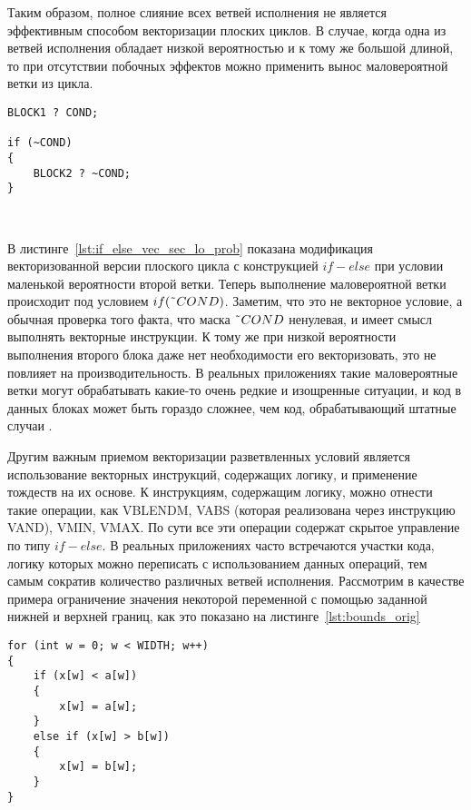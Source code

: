 \documentclass[
11pt,%
tightenlines,%
twoside,%
onecolumn,%
nofloats,%
nobibnotes,%
nofootinbib,%
superscriptaddress,%
noshowpacs,%
centertags]%
{revtex4}
\begin{document}
Таким образом, полное слияние всех ветвей исполнения не является эффективным способом векторизации плоских циклов.
В случае, когда одна из ветвей исполнения обладает низкой вероятностью и к тому же большой длиной, то при отсутствии побочных эффектов можно применить вынос маловероятной ветки из цикла.

\begin{lstlisting}[caption={Векторизованная конструкция $if-else$ с маловероятной второй веткой.},label={lst:if_else_vec_sec_lo_prob}]
BLOCK1 ? COND;

if (~COND)
{
    BLOCK2 ? ~COND;
}
\end{lstlisting}

\

В листинге~\ref{lst:if_else_vec_sec_lo_prob} показана модификация векторизованной версии плоского цикла с конструкцией $if-else$ при условии маленькой вероятности второй ветки.
Теперь выполнение маловероятной ветки происходит под условием $if (\text{\~{}}COND)$.
Заметим, что это не векторное условие, а обычная проверка того факта, что маска $\text{\~{}}COND$ ненулевая, и имеет смысл выполнять векторные инструкции.
К тому же при низкой вероятности выполнения второго блока даже нет необходимости его векторизовать, это не повлияет на производительность.
В реальных приложениях такие маловероятные ветки могут обрабатывать какие-то очень редкие и изощренные ситуации, и код в данных блоках может быть гораздо сложнее, чем код, обрабатывающий штатные случаи \cite{Rybakov_Aircraft}.

Другим важным приемом векторизации разветвленных условий является использование векторных инструкций, содержащих логику, и применение тождеств на их основе.
К инструкциям, содержащим логику, можно отнести такие операции, как VBLENDM, VABS (которая реализована через инструкцию VAND), VMIN, VMAX.
По сути все эти операции содержат скрытое управление по типу $if-else$.
В реальных приложениях часто встречаются участки кода, логику которых можно переписать с использованием данных операций, тем самым сократив количество различных ветвей исполнения.
Рассмотрим в качестве примера ограничение значения некоторой переменной с помощью заданной нижней и верхней границ, как это показано на листинге~\ref{lst:bounds_orig}

\begin{lstlisting}[caption={Ограничение значения величины с помощью нижней и верхней границ.},label={lst:bounds_orig}]
for (int w = 0; w < WIDTH; w++)
{
    if (x[w] < a[w])
    {
        x[w] = a[w];
    }
    else if (x[w] > b[w])
    {
        x[w] = b[w];
    }
}
\end{lstlisting}
\end{document}
